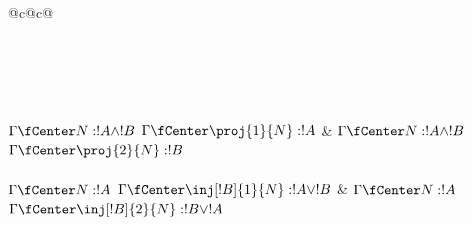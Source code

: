 \documentclass[../../../include/open-logic-section]{subfiles}
\begin{document}
\begin{table}
\begin{tabular}{@{}c@{}c@{}}
\\
\\[3ex]
\\[3ex]
\\[4ex]
\\[4ex]
\\[4ex]
\Axiom$\Gamma \fCenter N: !A \land !B$
\RightLabel{\Elim{\land}[1]}
\UnaryInf$\Gamma \fCenter \proj{1}{N} : !A$
\DisplayProof
&
\Axiom$\Gamma \fCenter N:!A \land !B$
\RightLabel{\Elim{\land}[2]}
\UnaryInf$\Gamma \fCenter \proj{2}{N} : !B$
\DisplayProof\\[3ex]
\\[4ex]
\Axiom$\Gamma \fCenter N: !A$
\RightLabel{\Intro{\lor}[1]}
\UnaryInf$\Gamma \fCenter \inj[!B]{1}{N} : !A \lor !B$
\DisplayProof
&
\Axiom$ \Gamma \fCenter N : !A$
\RightLabel{\Intro{\lor}[2]}
\UnaryInf$\Gamma \fCenter \inj[!B]{2}{N} : !B \lor !A$
\DisplayProof\\[3ex]
\\[4ex]
\end{tabular}
\caption{Rules of the propositional term-labelled intuitionistic
natural deduction system  serving as a type assignment
system.}
\end{table}
\end{document}
